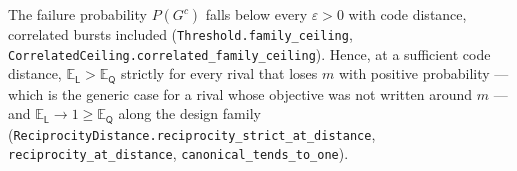 \documentclass[
]{article}
\begin{document}
The failure probability \(P(G^c)\) falls below every \(\varepsilon>0\)
with code distance, correlated bursts included
(\texttt{T\allowbreak{}h\allowbreak{}r\allowbreak{}e\allowbreak{}s\allowbreak{}h\allowbreak{}o\allowbreak{}l\allowbreak{}d\allowbreak{}.\allowbreak{}f\allowbreak{}a\allowbreak{}m\allowbreak{}i\allowbreak{}l\allowbreak{}y\allowbreak{}\_\allowbreak{}c\allowbreak{}e\allowbreak{}i\allowbreak{}l\allowbreak{}i\allowbreak{}n\allowbreak{}g},
\texttt{C\allowbreak{}o\allowbreak{}r\allowbreak{}r\allowbreak{}e\allowbreak{}l\allowbreak{}a\allowbreak{}t\allowbreak{}e\allowbreak{}d\allowbreak{}C\allowbreak{}e\allowbreak{}i\allowbreak{}l\allowbreak{}i\allowbreak{}n\allowbreak{}g\allowbreak{}.\allowbreak{}c\allowbreak{}o\allowbreak{}r\allowbreak{}r\allowbreak{}e\allowbreak{}l\allowbreak{}a\allowbreak{}t\allowbreak{}e\allowbreak{}d\allowbreak{}\_\allowbreak{}f\allowbreak{}a\allowbreak{}m\allowbreak{}i\allowbreak{}l\allowbreak{}y\allowbreak{}\_\allowbreak{}c\allowbreak{}e\allowbreak{}i\allowbreak{}l\allowbreak{}i\allowbreak{}n\allowbreak{}g}).
Hence, at a sufficient code distance,
\(\mathbb E_{\mathsf L}>\mathbb E_{\mathsf Q}\) strictly for every rival
that loses \(m\) with positive probability --- which is the generic case
for a rival whose objective was not written around \(m\) --- and
\(\mathbb E_{\mathsf L}\to1\ge\mathbb E_{\mathsf Q}\) along the design
family
(\texttt{R\allowbreak{}e\allowbreak{}c\allowbreak{}i\allowbreak{}p\allowbreak{}r\allowbreak{}o\allowbreak{}c\allowbreak{}i\allowbreak{}t\allowbreak{}y\allowbreak{}D\allowbreak{}i\allowbreak{}s\allowbreak{}t\allowbreak{}a\allowbreak{}n\allowbreak{}c\allowbreak{}e\allowbreak{}.\allowbreak{}r\allowbreak{}e\allowbreak{}c\allowbreak{}i\allowbreak{}p\allowbreak{}r\allowbreak{}o\allowbreak{}c\allowbreak{}i\allowbreak{}t\allowbreak{}y\allowbreak{}\_\allowbreak{}s\allowbreak{}t\allowbreak{}r\allowbreak{}i\allowbreak{}c\allowbreak{}t\allowbreak{}\_\allowbreak{}a\allowbreak{}t\allowbreak{}\_\allowbreak{}d\allowbreak{}i\allowbreak{}s\allowbreak{}t\allowbreak{}a\allowbreak{}n\allowbreak{}c\allowbreak{}e},
\texttt{r\allowbreak{}e\allowbreak{}c\allowbreak{}i\allowbreak{}p\allowbreak{}r\allowbreak{}o\allowbreak{}c\allowbreak{}i\allowbreak{}t\allowbreak{}y\allowbreak{}\_\allowbreak{}a\allowbreak{}t\allowbreak{}\_\allowbreak{}d\allowbreak{}i\allowbreak{}s\allowbreak{}t\allowbreak{}a\allowbreak{}n\allowbreak{}c\allowbreak{}e},
\texttt{c\allowbreak{}a\allowbreak{}n\allowbreak{}o\allowbreak{}n\allowbreak{}i\allowbreak{}c\allowbreak{}a\allowbreak{}l\allowbreak{}\_\allowbreak{}t\allowbreak{}e\allowbreak{}n\allowbreak{}d\allowbreak{}s\allowbreak{}\_\allowbreak{}t\allowbreak{}o\allowbreak{}\_\allowbreak{}o\allowbreak{}n\allowbreak{}e}).
\end{document}
